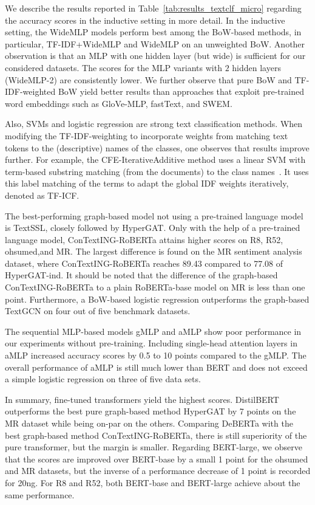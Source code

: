 \documentclass[acmsmall,nonacm]{acmart}
\begin{document}
We describe the results reported in Table~\ref{tab:results_textclf_micro} regarding the accuracy scores in the inductive setting in more detail. 
In the inductive setting, the WideMLP models perform best among the BoW-based methods, in particular, TF-IDF+WideMLP and WideMLP on an unweighted BoW.
Another observation is that an MLP with one hidden layer (but wide) is sufficient for our considered datasets.
The scores for the MLP variants with $2$ hidden layers (WideMLP-2) are consistently lower.
We further observe that pure BoW and TF-IDF-weighted BoW yield better results than approaches that exploit pre-trained word embeddings such as GloVe-MLP, fastText, and SWEM.

Also, SVMs and logistic regression are strong text classification methods.
When modifying the TF-IDF-weighting to incorporate weights from matching text tokens to the (descriptive) names of the classes, one observes that results improve further.
For example, the CFE-IterativeAdditive method uses a linear SVM with term-based substring matching (from the documents) to the class names~\cite{ATTIEH2023110215}.
It uses this label matching of the terms to adapt the global IDF weights iteratively, denoted as TF-ICF.

The best-performing graph-based model not using a pre-trained language model is TextSSL, closely followed by HyperGAT.
Only with the help of a pre-trained language model, ConTextING-RoBERTa attains higher scores on R8, R52, ohsumed,and  MR.
The largest difference is found on the MR sentiment analysis dataset, where ConTextING-RoBERTa reaches 89.43 compared to 77.08 of HyperGAT-ind.
It should be noted that the difference of the graph-based ConTextING-RoBERTa to a plain RoBERTa-base model on MR is less than one point.
Furthermore, a BoW-based logistic regression outperforms the graph-based TextGCN on four out of five benchmark datasets.

The sequential MLP-based models gMLP and aMLP show poor performance in our experiments without pre-training. Including single-head attention layers in aMLP increased accuracy scores by 0.5 to 10 points compared to the gMLP.
The overall performance of aMLP is still much lower than BERT and does not exceed a simple logistic regression on three of five data sets.

In summary, fine-tuned transformers yield the highest scores.
DistilBERT outperforms the best pure graph-based method HyperGAT by 7 points on the MR dataset while being on-par on the others.
Comparing DeBERTa with the best graph-based method ConTextING-RoBERTa, there is still superiority of the pure transformer, but the margin is smaller.
Regarding BERT-large, we observe that the scores are improved over BERT-base by a small 1 point for the ohsumed and MR datasets, but the inverse of a performance decrease of 1 point is recorded for 20ng. 
For R8 and R52, both BERT-base and BERT-large achieve about the same performance. 
\end{document}
